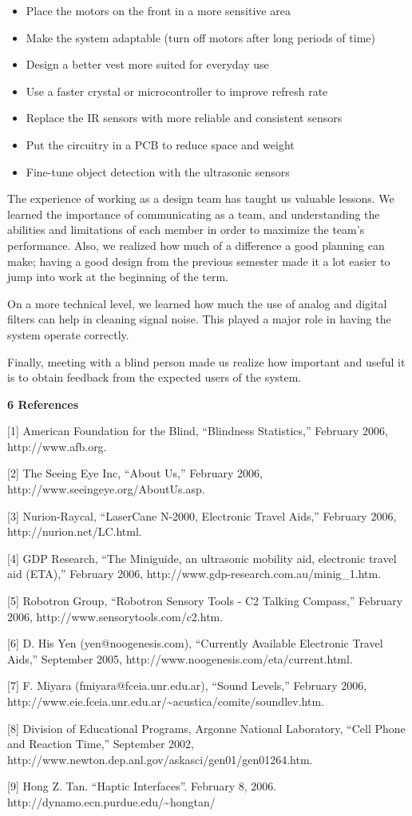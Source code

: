 \begin{itemize}
\item
  Place the motors on the front in a more sensitive area
\item
  Make the system adaptable (turn off motors after long periods of time)
\item
  Design a better vest more suited for everyday use
\item
  Use a faster crystal or microcontroller to improve refresh rate
\item
  Replace the IR sensors with more reliable and consistent sensors
\item
  Put the circuitry in a PCB to reduce space and weight
\item
  Fine-tune object detection with the ultrasonic sensors
\end{itemize}

The experience of working as a design team has taught us valuable
lessons. We learned the importance of communicating as a team, and
understanding the abilities and limitations of each member in order to
maximize the team's performance. Also, we realized how much of a
difference a good planning can make; having a good design from the
previous semester made it a lot easier to jump into work at the
beginning of the term.

On a more technical level, we learned how much the use of analog and
digital filters can help in cleaning signal noise. This played a major
role in having the system operate correctly.

Finally, meeting with a blind person made us realize how important and
useful it is to obtain feedback from the expected users of the system.

\textbf{6 References}

{[}1{]} American Foundation for the Blind, ``Blindness Statistics,''
February 2006, http://www.afb.org.

{[}2{]} The Seeing Eye Inc, ``About Us,'' February 2006,
http://www.seeingeye.org/AboutUs.asp.

{[}3{]} Nurion-Raycal, ``LaserCane N-2000, Electronic Travel Aids,''
February 2006, http://nurion.net/LC.html.

{[}4{]} GDP Research, ``The Miniguide, an ultrasonic mobility aid,
electronic travel aid (ETA),'' February 2006,
http://www.gdp-research.com.au/minig\_1.htm.

{[}5{]} Robotron Group, ``Robotron Sensory Tools - C2 Talking Compass,''
February 2006, http://www.sensorytools.com/c2.htm.

{[}6{]} D. His Yen (yen@noogenesis.com), ``Currently Available
Electronic Travel Aids,'' September 2005,
http://www.noogenesis.com/eta/current.html.

{[}7{]} F. Miyara (fmiyara@fceia.unr.edu.ar), ``Sound Levels,'' February
2006,
http://www.eie.fceia.unr.edu.ar/\textasciitilde acustica/comite/soundlev.htm.

{[}8{]} Division of Educational Programs, Argonne National Laboratory,
``Cell Phone and Reaction Time,'' September 2002,
http://www.newton.dep.anl.gov/askasci/gen01/gen01264.htm.

{[}9{]} Hong Z. Tan. ``Haptic Interfaces''. February 8, 2006.
http://dynamo.ecn.purdue.edu/\textasciitilde hongtan/
